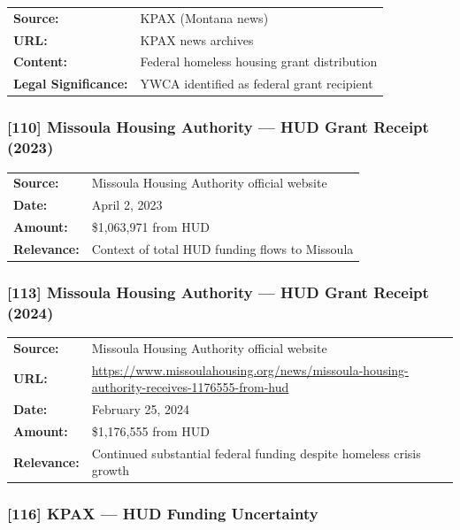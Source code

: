 \documentclass[11pt,letterpaper]{article}
\newcommand{\citeref}[1]{\textbf{\color{NavyBlue}[#1]}}
\begin{document}
\begin{tabular}{@{}p{1.4in}p{4.6in}@{}}
\textbf{Source:} & KPAX (Montana news)\\
\textbf{URL:} & KPAX news archives\\
\textbf{Content:} & Federal homeless housing grant distribution\\
\textbf{Legal Significance:} & YWCA identified as federal grant recipient\\
\end{tabular}

\subsubsection{\citeref{110} Missoula Housing Authority --- HUD Grant Receipt (2023)}

\begin{tabular}{@{}p{1.4in}p{4.6in}@{}}
\textbf{Source:} & Missoula Housing Authority official website\\
\textbf{Date:} & April 2, 2023\\
\textbf{Amount:} & \$1,063,971 from HUD\\
\textbf{Relevance:} & Context of total HUD funding flows to Missoula\\
\end{tabular}

\subsubsection{\citeref{113} Missoula Housing Authority --- HUD Grant Receipt (2024)}

\begin{tabular}{@{}p{1.4in}p{4.6in}@{}}
\textbf{Source:} & Missoula Housing Authority official website\\
\textbf{URL:} & \url{https://www.missoulahousing.org/news/missoula-housing-authority-receives-1176555-from-hud}\\
\textbf{Date:} & February 25, 2024\\
\textbf{Amount:} & \$1,176,555 from HUD\\
\textbf{Relevance:} & Continued substantial federal funding despite homeless crisis growth\\
\end{tabular}

\subsubsection{\citeref{116} KPAX --- HUD Funding Uncertainty}
\end{document}
